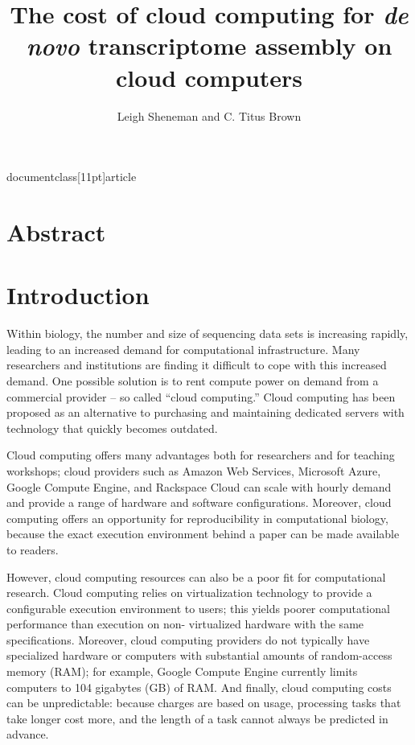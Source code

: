 documentclass[11pt]{article}



\title{The cost of cloud computing for {\em de novo} transcriptome 
assembly on cloud computers}
\author{Leigh Sheneman and C. Titus Brown}
\maketitle

\section*{Abstract}

\section*{Introduction}

Within biology, the number and size of sequencing data sets is
increasing rapidly, leading to an increased demand for computational
infrastructure. Many researchers and institutions are finding it
difficult to cope with this increased demand.  One possible solution
is to rent compute power on demand from a commercial provider -- so
called ``cloud computing.'' Cloud computing has been proposed as an
alternative to purchasing and maintaining dedicated servers with
technology that quickly becomes outdated.

Cloud computing offers many advantages both for researchers and for
teaching workshops; cloud providers such as Amazon Web Services,
Microsoft Azure, Google Compute Engine, and Rackspace Cloud can scale
with hourly demand and provide a range of hardware and software
configurations.  Moreover, cloud computing offers an opportunity for
reproducibility in computational biology, because the exact execution
environment behind a paper can be made available to readers.

However, cloud computing resources can also be a poor fit for
computational research.  Cloud computing relies on virtualization
technology to provide a configurable execution environment to users;
this yields poorer computational performance than execution on non-
virtualized hardware with the same specifications.  Moreover, cloud
computing providers do not typically have specialized hardware or
computers with substantial amounts of random-access memory (RAM); for
example, Google Compute Engine currently limits computers to 104
gigabytes (GB) of RAM. And finally, cloud computing costs can be
unpredictable: because charges are based on usage, processing tasks
that take longer cost more, and the length of a task cannot always be
predicted in advance.

